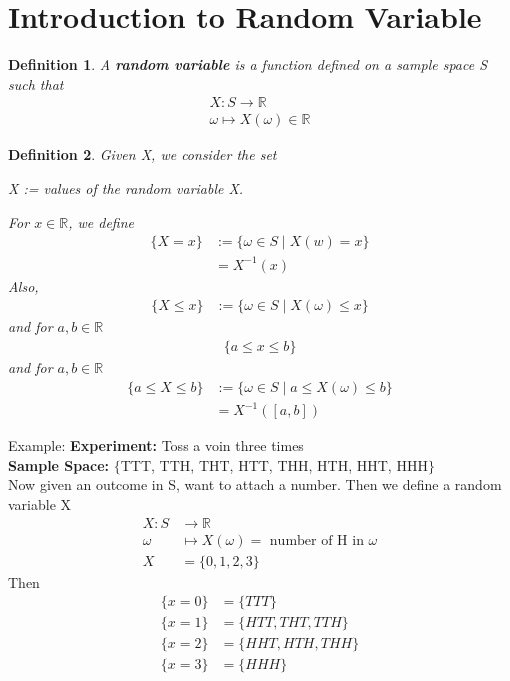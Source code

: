 \documentclass[11pt,oneside]{book}
\theoremstyle{break}
\theoremstyle{break}
\newtheorem{defn}{Definition}[corL]
\newcommand{\example}{\color{WildStrawberry}Example: \color{black}}
\begin{document}
\section[Introduction to Random Variable]{Introduction to Random Variable}
\begin{defn}
A \textbf{random variable} is a function defined on a sample space S such that \begin{align*}
X:S\rightarrow \mathbb{R}\\
\omega \mapsto X(\omega) \in \mathbb{R}
\end{align*}
\end{defn}
\begin{defn}
Given X, we consider the set \begin{center}
X := values of the random variable X.
\end{center}
For $x\in \mathbb{R}$, we define \begin{align*}
\{X=x\}&:=\{\omega\in S\mid X(w)=x\}\\
&=X^{-1}(x)
\end{align*}
Also, \begin{align*}
\{X\leq x\}&:=\{\omega \in S \mid X(\omega)\leq x\}
\end{align*}
and for $a,b\in \mathbb{R}$\begin{align*}
\{a\leq x\leq b\}
\end{align*}
and for $a,b\in \mathbb{R}$\begin{align*}
\{a\leq X\leq b\}&:=\{\omega\in S\mid a\leq X(\omega)\leq b\}\\
&=X^{-1}([a,b])
\end{align*}
\end{defn}
\example \textbf{Experiment:} Toss a voin three times\\
\text{\qquad} \text{\qquad} \textbf{Sample Space:} $\{$TTT, TTH, THT, HTT, THH, HTH, HHT, HHH$\}$\\
Now given an outcome in S, want to attach a number. Then we define a random variable X \begin{align*}
X:S&\rightarrow \mathbb{R}\\
\omega &\mapsto X(\omega)= \text{ number of H in }\omega\\
X&=\{0,1,2,3\}
\end{align*}
Then \begin{align*}
\{x=0\}&=\{TTT\}\\
\{x=1\}&=\{HTT,THT,TTH\}\\
\{x=2\}&=\{HHT,HTH,THH\}\\
\{x=3\}&=\{HHH\}
\end{align*}
\end{document}
